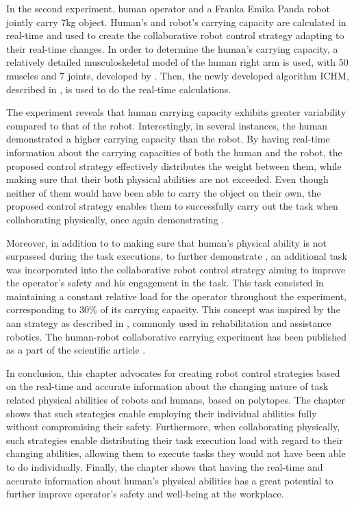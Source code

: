 In the second experiment, human operator and a Franka Emika Panda robot jointly carry 7kg object. Human's and robot's carrying capacity are calculated in real-time and used to create the collaborative robot control strategy adapting to their real-time changes.
In order to determine the human's carrying capacity, a relatively detailed musculoskeletal model of the human right arm is used, with 50 muscles and 7 joints, developed by \citet{holzbaur2005model}. Then, the newly developed algorithm ICHM, described in , is used to do the real-time calculations.

The experiment reveals that human carrying capacity exhibits greater variability compared to that of the robot. Interestingly, in several instances, the human demonstrated a higher carrying capacity than the robot. 
By having real-time information about the carrying capacities of both the human and the robot, the proposed control strategy effectively distributes the weight between them, while making sure that their both physical abilities are not exceeded. Even though neither of them would have been able to carry the object on their own, the proposed control strategy enables them to successfully carry out the task when collaborating physically, once again demonstrating . 

Moreover, in addition to to making sure that human's physical ability is not surpassed during the task executions, to further demonstrate , an additional task was incorporated into the collaborative robot control strategy aiming to improve the operator's safety and his engagement in the task. This task consisted in maintaining a constant relative load for the operator throughout the experiment, corresponding to 30\% of its carrying capacity. This concept was inspired by the \gls{aan} strategy as described in \citet{carmichael2013admittance}, commonly used in rehabilitation and assistance robotics. The human-robot collaborative carrying experiment has been published as a part of the scientific article \citet{Skuric2022human}.

In conclusion, this chapter advocates for creating robot control strategies based on the real-time and accurate information about the changing nature of task related physical abilities of robots and humans, based on polytopes. The chapter shows that such strategies enable employing their individual abilities fully without compromising their safety. Furthermore, when collaborating physically, such strategies enable distributing their task execution load with regard to their changing abilities, allowing them to execute tasks they would not have been able to do individually. Finally, the chapter shows that having the real-time and accurate information about human's physical abilities has a great potential to further improve operator's safety and well-being at the workplace. 


